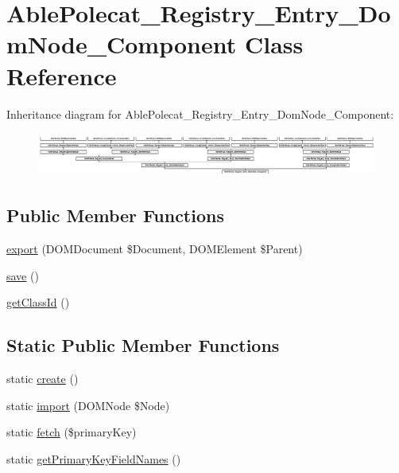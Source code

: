 \hypertarget{class_able_polecat___registry___entry___dom_node___component}{}\section{Able\+Polecat\+\_\+\+Registry\+\_\+\+Entry\+\_\+\+Dom\+Node\+\_\+\+Component Class Reference}
\label{class_able_polecat___registry___entry___dom_node___component}
Inheritance diagram for Able\+Polecat\+\_\+\+Registry\+\_\+\+Entry\+\_\+\+Dom\+Node\+\_\+\+Component\+:\begin{figure}[H]
\begin{center}
\leavevmode
\includegraphics[height=1.463415cm]{class_able_polecat___registry___entry___dom_node___component}
\end{center}
\end{figure}
\subsection*{Public Member Functions}
\begin{DoxyCompactItemize}
\item 
\hyperlink{class_able_polecat___registry___entry___dom_node___component_a0a05b2e4b3a44390eeb042064e427b1a}{export} (D\+O\+M\+Document \$Document, D\+O\+M\+Element \$Parent)
\item 
\hyperlink{class_able_polecat___registry___entry___dom_node___component_afc8a3c62679cf00ade9f15fb2a6d6132}{save} ()
\item 
\hyperlink{class_able_polecat___registry___entry___dom_node___component_acc9039051a8b6d4fe7c5ddfbaedbcbcb}{get\+Class\+Id} ()
\end{DoxyCompactItemize}
\subsection*{Static Public Member Functions}
\begin{DoxyCompactItemize}
\item 
static \hyperlink{class_able_polecat___registry___entry___dom_node___component_a239b1c70258014a86569483c2d009de6}{create} ()
\item 
static \hyperlink{class_able_polecat___registry___entry___dom_node___component_aa44a46592f08e874ef793aee209ada30}{import} (D\+O\+M\+Node \$Node)
\item 
static \hyperlink{class_able_polecat___registry___entry___dom_node___component_a363352ee6a773e5aae4ea3efbc0fa753}{fetch} (\$primary\+Key)
\item 
static \hyperlink{class_able_polecat___registry___entry___dom_node___component_a421b5f1cf6301568ecc2f572537f0b90}{get\+Primary\+Key\+Field\+Names} ()
\end{DoxyCompactItemize}
